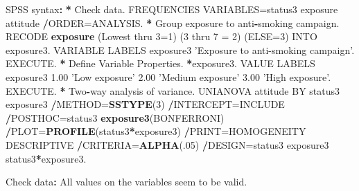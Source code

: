 \documentclass[a4paper]{book}
\newenvironment{Shaded}{\begin{snugshade}}{\end{snugshade}}
\newcommand{\KeywordTok}[1]{\textcolor[rgb]{0,0,0}{\textbf{#1}}}
\newcommand{\DataTypeTok}[1]{\textcolor[rgb]{0,0,0}{#1}}
\newcommand{\DecValTok}[1]{\textcolor[rgb]{0.00,0.00,0.00}{#1}}
\newcommand{\FloatTok}[1]{\textcolor[rgb]{0.00,0.00,0.00}{#1}}
\newcommand{\StringTok}[1]{\textcolor[rgb]{0.00,0.00,0.00}{#1}}
\newcommand{\OperatorTok}[1]{\textcolor[rgb]{0.00,0.00,0.00}{\textbf{#1}}}
\newcommand{\ErrorTok}[1]{\textcolor[rgb]{0.00,0.00,0.00}{\textbf{#1}}}
\newcommand{\NormalTok}[1]{#1}
\theoremstyle{definition}
\theoremstyle{definition}
\theoremstyle{definition}
\theoremstyle{remark}
\begin{document}
\begin{Shaded}
\begin{Highlighting}[]
\NormalTok{SPSS syntax}\OperatorTok{:}\StringTok{  }
\StringTok{  }
\ErrorTok{*}\StringTok{ }\NormalTok{Check data.  }
\NormalTok{FREQUENCIES VARIABLES=status3 exposure attitude  }
  \OperatorTok{/}\NormalTok{ORDER=ANALYSIS.  }
\OperatorTok{*}\StringTok{ }\NormalTok{Group exposure to anti}\OperatorTok{-}\NormalTok{smoking campaign.  }
\NormalTok{RECODE }\KeywordTok{exposure}\NormalTok{ (Lowest thru }\DecValTok{3}\NormalTok{=}\DecValTok{1}\NormalTok{) (}\DecValTok{3}\NormalTok{ thru }\DecValTok{7}\NormalTok{ =}\StringTok{ }\DecValTok{2}\NormalTok{) (}\DataTypeTok{ELSE=}\DecValTok{3}\NormalTok{) INTO exposure3.  }
\NormalTok{VARIABLE LABELS  exposure3 }\StringTok{'Exposure to anti-smoking campaign'}\NormalTok{.  }
\NormalTok{EXECUTE.  }
\OperatorTok{*}\StringTok{ }\NormalTok{Define Variable Properties.  }
\OperatorTok{*}\NormalTok{exposure3.  }
\NormalTok{VALUE LABELS exposure3  }
  \FloatTok{1.00} \StringTok{'Low exposure'}  
  \FloatTok{2.00} \StringTok{'Medium exposure'}  
  \FloatTok{3.00} \StringTok{'High exposure'}\NormalTok{.  }
\NormalTok{EXECUTE.  }
\OperatorTok{*}\StringTok{ }\NormalTok{Two}\OperatorTok{-}\NormalTok{way analysis of variance.  }
\NormalTok{UNIANOVA attitude BY status3 exposure3  }
  \OperatorTok{/}\NormalTok{METHOD=}\KeywordTok{SSTYPE}\NormalTok{(}\DecValTok{3}\NormalTok{)  }
  \OperatorTok{/}\NormalTok{INTERCEPT=INCLUDE  }
  \OperatorTok{/}\NormalTok{POSTHOC=status3 }\KeywordTok{exposure3}\NormalTok{(BONFERRONI)   }
  \OperatorTok{/}\NormalTok{PLOT=}\KeywordTok{PROFILE}\NormalTok{(status3}\OperatorTok{*}\NormalTok{exposure3)  }
  \OperatorTok{/}\NormalTok{PRINT=HOMOGENEITY DESCRIPTIVE  }
  \OperatorTok{/}\NormalTok{CRITERIA=}\KeywordTok{ALPHA}\NormalTok{(.}\DecValTok{05}\NormalTok{)  }
  \OperatorTok{/}\NormalTok{DESIGN=status3 exposure3 status3}\OperatorTok{*}\NormalTok{exposure3.  }
  
\NormalTok{Check data}\OperatorTok{:}\StringTok{  }
\StringTok{  }
\NormalTok{All values on the variables seem to be valid.  }
  

\end{Highlighting}
\end{Shaded}
\end{document}
